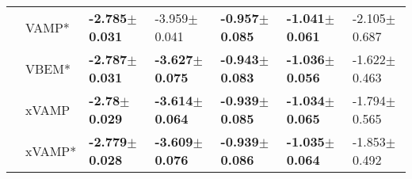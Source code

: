 \begin{tabular}{lllllll}
                 & VAMP* &  \textbf{-2.785$\pm$0.031} &           -3.959$\pm$0.041 &  \textbf{-0.957$\pm$0.085} &  \textbf{-1.041$\pm$0.061} &           -2.105$\pm$0.687 \\
                 & VBEM* &  \textbf{-2.787$\pm$0.031} &  \textbf{-3.627$\pm$0.075} &  \textbf{-0.943$\pm$0.083} &  \textbf{-1.036$\pm$0.056} &           -1.622$\pm$0.463 \\
                 & xVAMP &   \textbf{-2.78$\pm$0.029} &  \textbf{-3.614$\pm$0.064} &  \textbf{-0.939$\pm$0.085} &  \textbf{-1.034$\pm$0.065} &           -1.794$\pm$0.565 \\
                 & xVAMP* &  \textbf{-2.779$\pm$0.028} &  \textbf{-3.609$\pm$0.076} &  \textbf{-0.939$\pm$0.086} &  \textbf{-1.035$\pm$0.064} &           -1.853$\pm$0.492 \\
\bottomrule
\end{tabular}

